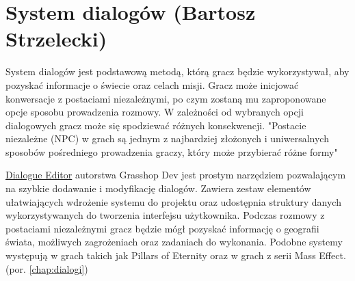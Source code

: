 \section{System dialogów (Bartosz Strzelecki)}

System dialogów jest podstawową metodą, którą gracz będzie wykorzystywał, aby pozyskać informacje  o świecie oraz celach misji.
Gracz może inicjować konwersacje z postaciami niezależnymi, po czym zostaną mu zaproponowane opcje sposobu prowadzenia rozmowy.
W zależności od wybranych opcji dialogowych gracz może się spodziewać różnych konsekwencji.
"Postacie niezależne (NPC) w grach są jednym z najbardziej złożonych i uniwersalnych sposobów pośredniego prowadzenia graczy, który może przybierać różne formy"\cite{projektowanie_gier}


\href{https://assetstore.unity.com/packages/tools/utilities/dialogue-editor-168329}{Dialogue Editor} autorstwa Grasshop Dev jest prostym narzędziem pozwalającym na szybkie dodawanie i modyfikację dialogów.
Zawiera zestaw elementów ułatwiających wdrożenie systemu do projektu oraz udostępnia struktury danych wykorzystywanych do tworzenia interfejsu użytkownika.
Podczas rozmowy z postaciami niezależnymi gracz będzie mógł pozyskać informację o geografii świata, możliwych zagrożeniach oraz zadaniach do wykonania. 
Podobne systemy występują w grach takich jak Pillars of Eternity oraz w grach z serii Mass Effect. (por. \ref{chap:dialogi})

